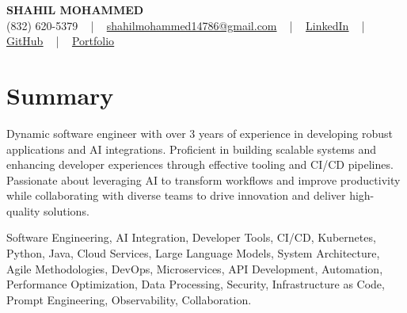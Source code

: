 \documentclass[letterpaper,10pt]{article}
\begin{document}
\begin{center}
    {\fontsize{14pt}{12pt}\selectfont \textbf{\MakeUppercase{Shahil Mohammed}}}\\ \vspace{2pt}
    \fontsize{10pt}{12pt}\selectfont (832) 620-5379 ~ | ~ \href{mailto:shahilmohammed14786@gmail.com}{shahilmohammed14786@gmail.com} ~ | ~  
    \href{https://www.linkedin.com/in/shahil-mohammed-9652931a1/}{\color{blue}\underline{LinkedIn}}  ~ | ~ 
    \href{https://github.com/freakbeast14}{\color{blue}\underline{GitHub}} ~ | ~ 
    \href{https://shahil-mohammed.netlify.app/}{\color{blue}\underline{Portfolio}}
    \vspace{-8pt}
\end{center}

\section{Summary}
\vspace{-2pt}\fontsize{8pt}{9pt}\selectfont
Dynamic software engineer with over 3 years of experience in developing robust applications and AI integrations. Proficient in building scalable systems and enhancing developer experiences through effective tooling and CI/CD pipelines. Passionate about leveraging AI to transform workflows and improve productivity while collaborating with diverse teams to drive innovation and deliver high-quality solutions.
 \vspace{-5pt}
 
{\fontsize{1pt}{1pt}\selectfont\color{white}
Software Engineering, AI Integration, Developer Tools, CI/CD, Kubernetes, Python, Java, Cloud Services, Large Language Models, System Architecture, Agile Methodologies, DevOps, Microservices, API Development, Automation, Performance Optimization, Data Processing, Security, Infrastructure as Code, Prompt Engineering, Observability, Collaboration.
}
\vspace{-8pt}

\vspace{-2pt}
\end{document}

